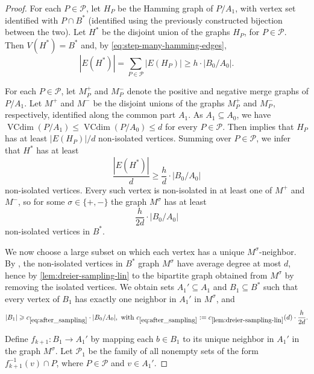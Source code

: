 \documentclass[11pt]{article}
\theoremstyle{definition}
\newcommand{\inducedSS}[2]{#1/#2}%
\renewcommand{\le}{\leqslant}
\renewcommand{\ge}{\geqslant}
\renewcommand{\subset}{\subseteq}
\newcommand{\set}[1]{\{#1\}}
\newcommand{\from}{\colon}
\renewcommand{\cal}{\mathcal}
\DeclareMathOperator{\VCdim}{VCdim}
\begin{document}
\begin{proof}
For each $P\in\cal P$, let $H_P$ be the Hamming graph of
$\inducedSS{P}{A_1}$, with vertex set identified with $P\cap B^*$ (identified using the previously constructed bijection between the two).
Let $H^*$ be the disjoint union of the graphs $H_P$, for $P\in\cal P$.
Then $V(H^*)=B^*$ and, by \eqref{eq:step-many-hamming-edges},
\[
  |E(H^*)|
  =\sum_{P\in\cal P}|E(H_P)|
  \ge h \cdot |\inducedSS{B_0}{A_0}|.
\]

For each $P\in\cal P$, let $M_P^+$ and $M_P^-$ denote the positive and
negative merge graphs of $\inducedSS{P}{A_1}$.
Let $M^+$ and $M^-$ be the disjoint unions of the graphs
$M_P^+$ and $M_P^-$, respectively, identified along the common part $A_1$.
As $A_1\subset A_0$,
 we have $\VCdim(\inducedSS{P}{A_1})\le \VCdim(\inducedSS{P}{A_0})\le d$ for every $P\in\cal P$.
Then  implies that $H_P$ has at least $|E(H_P)|/d$
non-isolated vertices.
Summing over $P\in\cal P$, we infer that $H^*$ has at least
\[
  \frac{|E(H^*)|}{d}
  \ge \frac{h}{d} \cdot |\inducedSS{B_0}{A_0}|
\]
non-isolated vertices.
Every such vertex is non-isolated in at least one
of $M^+$ and $M^-$, so for some $\sigma\in\set{+,-}$ the graph $M^\sigma$
has at least
\begin{equation}\label{eq:step-many-nonis}
  \frac{h}{2d} \cdot |\inducedSS{B_0}{A_0}|
\end{equation}
non-isolated vertices in $B^*$.

We now choose a large subset on which each vertex has a unique
$M^\sigma$-neighbor.
By , the non-isolated vertices in $B^*$ graph $M^{\sigma}$ have average degree at most $d$, hence by \cref{lem:dreier-sampling-lin} to the bipartite graph obtained
from $M^\sigma$ by removing the isolated vertices. %
We obtain sets $A_1'\subseteq A_1$ and $B_1\subseteq B^*$ such that every
vertex of $B_1$ has exactly one neighbor in $A_1'$ in $M^\sigma$, and
\begin{equation}\label{eq:after_sampling}
  |B_1|
  \ge c_{\cref{eq:after_sampling}} \cdot |\inducedSS{B_0}{A_0}|, \text{ with } c_{\cref{eq:after_sampling}} := c_{\ref{lem:dreier-sampling-lin}}
    (d)
    \cdot \frac{h} {2d}.
\end{equation}

Define $f_{k+1}\from B_1\to A_1'$ by mapping each $b\in B_1$ to its unique
neighbor in $A_1'$ in the graph $M^\sigma$.
Let $\cal P_1$ be the family of all nonempty sets of the form
$f_{k+1}^{-1}(v)\cap P$, where $P\in\cal P$ and $v\in A_1'$.


\end{proof}
\end{document}
